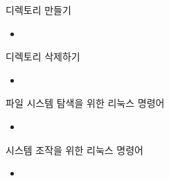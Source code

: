 \documentclass[aspectratio=1610,20pt,xcolor=pdftex,dvipsnames,table,handout]{beamer}
\begin{document}
		\begin{frame} [t,plain]

			\begin{block} {디렉토리 만들기}
			\setlength{\leftmargini}{2em}			
			\begin{itemize}
				\item 
			\end{itemize}
			\end{block}						


			\begin{block} {디렉토리 삭제하기}
			\setlength{\leftmargini}{2em}			
			\begin{itemize}
				\item 
			\end{itemize}
			\end{block}						

		\end{frame}			



		\begin{frame} [t,plain]

			\begin{block} {파일 시스템 탐색을 위한 리눅스 명령어}
			\setlength{\leftmargini}{2em}			
			\begin{itemize}
				\item 
			\end{itemize}
			\end{block}						

		\end{frame}			

		\begin{frame} [t,plain]

			\begin{block} {시스템 조작을 위한 리눅스 명령어}
			\setlength{\leftmargini}{2em}			
			\begin{itemize}
				\item 
			\end{itemize}
			\end{block}						

		\end{frame}			
\end{document}
